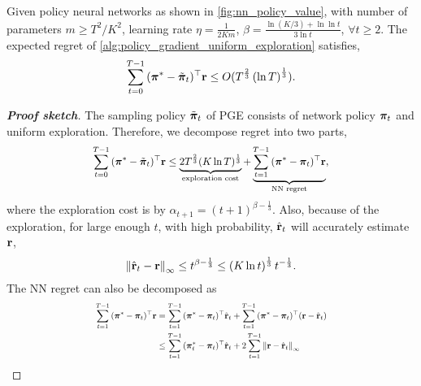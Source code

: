 \begin{thm}
	\label{thm:policy_gradient_main_result}
	Given policy neural networks as shown in \cref{fig:nn_policy_value}, with number of parameters $m \ge T^2 / K^2$, learning rate $\eta = \frac{1}{2 K m}$, $\beta = \frac{ \ln{(K/3) + \ln{\ln{t}} } }{ 3 \ln{t}}$, $\forall t \ge 2$. The expected regret of \cref{alg:policy_gradient_uniform_exploration} satisfies,
	\begin{equation*}
	\begin{split}
	\sum\limits_{t=0}^{T-1}{ ( {\boldsymbol{\pi}}^* - \tilde{{\boldsymbol{\pi}}}_t )^\top {\mathbf{r}}} \le O(T^{\frac{2}{3}}\left( \ln{T} \right)^{\frac{1}{3}}).
	\end{split}
	\end{equation*}
\end{thm}
\begin{proof}[\bf Proof sketch]
The sampling policy $\tilde{{\boldsymbol{\pi}}}_t$ of PGE consists of network policy ${\boldsymbol{\pi}}_t$ and uniform exploration. Therefore, we decompose regret into two parts,
\begin{equation}
 \label{eq:total_regret_decomposition}
 \scalemath{0.9}{
 \begin{split}
 \sum\limits_{t=0}^{T-1}{ ( \rvpi^* - \tilde{\rvpi}_t )^\top \rvr} \le \underbrace{ 2 T^{\frac{2}{3}} ( K \ln{T} )^{\frac{1}{3}} }_{\text{exploration cost}} + \underbrace{ \sum\limits_{t=1}^{T-1}{ ( {\rvpi^*} - \rvpi_t)^\top \rvr } }_{\text{NN regret}},
 \end{split}
 }
 \end{equation}
where the exploration cost is by $\alpha_{t+1} = \left(t+1\right)^{ \beta - \frac{1}{3}}$. Also, because of the exploration, for large enough $t$, with high probability, $\hat{{\mathbf{r}}}_t$ will accurately estimate ${\mathbf{r}}$,
\begin{equation*}
    \left\| \hat{{\mathbf{r}}}_t - {\mathbf{r}} \right\|_\infty \le t^{\beta - \frac{1}{3}} \le \left( K \ln{t} \right) ^\frac{1}{3} t^{- \frac{1}{3}}.
\end{equation*}
The NN regret can also be decomposed as
\begin{equation}
\label{eq:playing_learning_phase_regret_decomposition}
\scalemath{0.75}{
\begin{split}
\sum\limits_{t=1}^{T-1}{ ( {\rvpi^*} - \rvpi_t )^\top \rvr}  &= \sum\limits_{t=1}^{T-1}{ ( {\rvpi^*} - \rvpi_t )^\top \hat{\rvr}_t } + \sum\limits_{t=1}^{T-1}{ ( {\rvpi^*} - \rvpi_t )^\top ( \rvr - \hat{\rvr}_t ) }\\
&\le \sum\limits_{t=1}^{T-1}{ ( {\rvpi_t^*} - \rvpi_t )^\top \hat{\rvr}_t  } + 2 \sum\limits_{t=1}^{T-1}{ \left\| \rvr - \hat{\rvr}_t \right\|_\infty } \\

\end{split}}
\end{equation}
\end{proof}
